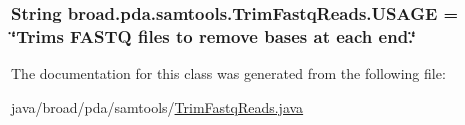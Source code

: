 \hypertarget{classbroad_1_1pda_1_1samtools_1_1_trim_fastq_reads_a07996cad24bf5196d1366fd56ad0ce48}{
\subsubsection[{U\+S\+A\+G\+E}]{\setlength{\rightskip}{0pt plus 5cm}String broad.\+pda.\+samtools.\+Trim\+Fastq\+Reads.\+U\+S\+A\+G\+E = \char`\"{}Trims F\+A\+S\+T\+Q files to remove bases at each end.\char`\"{}}}\label{classbroad_1_1pda_1_1samtools_1_1_trim_fastq_reads_a07996cad24bf5196d1366fd56ad0ce48}


The documentation for this class was generated from the following file\+:\begin{DoxyCompactItemize}
\item 
java/broad/pda/samtools/\hyperlink{_trim_fastq_reads_8java}{Trim\+Fastq\+Reads.\+java}\end{DoxyCompactItemize}

